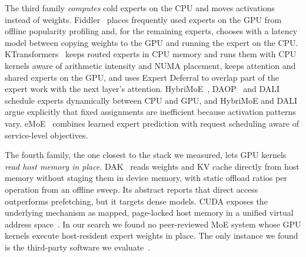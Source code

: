 The third family \emph{computes} cold experts on the CPU and moves activations instead of weights.
Fiddler~\citep{kamahori2025fiddler} places frequently used experts on the GPU from offline popularity profiling and,
for the remaining experts, chooses with a latency model between copying weights to the GPU and running the expert on
the CPU. KTransformers~\citep{chen2025ktransformers} keeps routed experts in CPU memory and runs them with CPU kernels
aware of arithmetic intensity and NUMA placement, keeps attention and shared experts on the GPU, and uses Expert
Deferral to overlap part of the expert work with the next layer's attention. HybriMoE~\citep{zhong2025hybrimoe},
DAOP~\citep{zhang2025daop} and DALI~\citep{zhu2026dali} schedule experts dynamically between CPU and GPU, and HybriMoE
and DALI argue explicitly that fixed assignments are inefficient because activation patterns vary.
eMoE~\citep{tairin2025emoe} combines learned expert prediction with request scheduling aware of service-level
objectives.

The fourth family, the one closest to the stack we measured, lets GPU kernels \emph{read host memory in place}.
DAK~\citep{lin2026dak} reads weights and KV cache directly from host memory without staging them in device memory,
with static offload ratios per operation from an offline sweep. Its abstract reports that direct access outperforms
prefetching, but it targets dense models. CUDA exposes the underlying mechanism as mapped, page-locked host memory in
a unified virtual address space~\citep{nvidia2026cudaguide}. In our search we found no peer-reviewed MoE system whose
GPU kernels execute host-resident expert weights in place. The only instance we found is the third-party software we
evaluate~\citep{vcruz2026vllmexl3,diffbot2026dsv41exl3}.

